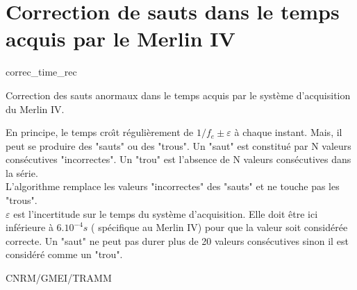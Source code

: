 %
\section{Correction de sauts dans le temps acquis par le Merlin IV}

 {\sf correc\_time\_rec}

Correction des sauts anormaux dans le temps acquis par le
syst\`eme d'acquisition du Merlin IV. 

\bigskip






En principe, le temps cro\^{\i}t r\'eguli\`erement
de $1/f_e \pm \varepsilon $ \`a chaque instant.
Mais, il peut se produire des "sauts" ou des "trous".
Un "saut" est constitu\'e par N valeurs 
cons\'ecutives "incorrectes". 
Un "trou" est l'absence de N valeurs 
cons\'ecutives dans la s\'erie. \\
L'algorithme remplace les valeurs "incorrectes" des
"sauts" et ne touche pas les "trous".\\
$\varepsilon$ est l'incertitude sur le temps du
syst\`eme d'acquisition. Elle doit \^etre ici
inf\'erieure \`a $6.10^{-4} s$ ( sp\'ecifique au
Merlin IV) pour que la valeur soit consid\'er\'ee
correcte.
Un "saut" ne peut pas durer plus de 20 valeurs
cons\'ecutives sinon il est consid\'er\'e 
comme un "trou".


CNRM/GMEI/TRAMM

